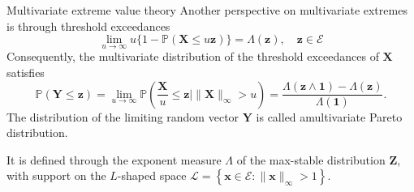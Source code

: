 \documentclass[11pt]{beamer}
\newcommand{\bx}{\boldsymbol{x}}
\newcommand{\bX}{\boldsymbol{X}}
\newcommand{\bY}{\boldsymbol{Y}}
\newcommand{\bZ}{\boldsymbol{Z}}
\newcommand{\bz}{\boldsymbol{z}}
\begin{document}
\begin{frame}{Multivariate extreme value theory}
Another perspective on multivariate extremes is through threshold exceedances
$$
\lim _{u \rightarrow \infty} u\{1-\mathbb{P}(\bX \leqslant u \bz)\}=\Lambda(\bz), \quad \bz \in \mathcal{E}
$$
Consequently, the multivariate distribution of the threshold exceedances of $\bX$ satisfies
$$
\mathbb{P}(\mathbf{Y} \leqslant \bz)=\lim _{u \rightarrow \infty} \mathbb{P}\left(\frac{\bX}{u} \leqslant \bz \mid\|\bX\|_{\infty}>u\right)=\frac{\Lambda(\bz \wedge \mathbf{1})-\Lambda(\bz)}{\Lambda(\mathbf{1})}.
$$
The distribution of the limiting random vector $\bY$ is called amultivariate Pareto distribution.

\vspace{3ex}

It is defined through the exponent measure $\Lambda$ of the max-stable
distribution $\bZ$, with support on the $L$-shaped space $\mathcal{L}=\left\{\mathbf{x} \in \mathcal{E}:\|\bx\|_{\infty}>1\right\}$.
\end{frame}
\end{document}

